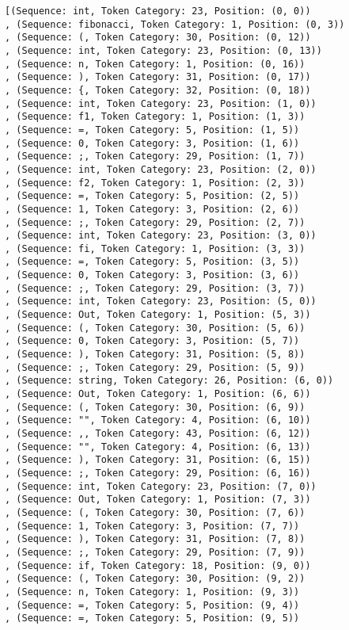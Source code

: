 \documentclass[a4paper, 12pt, article]{memoir}
\begin{document}
\begin{lstlisting}
[(Sequence: int, Token Category: 23, Position: (0, 0))
, (Sequence: fibonacci, Token Category: 1, Position: (0, 3))
, (Sequence: (, Token Category: 30, Position: (0, 12))
, (Sequence: int, Token Category: 23, Position: (0, 13))
, (Sequence: n, Token Category: 1, Position: (0, 16))
, (Sequence: ), Token Category: 31, Position: (0, 17))
, (Sequence: {, Token Category: 32, Position: (0, 18))
, (Sequence: int, Token Category: 23, Position: (1, 0))
, (Sequence: f1, Token Category: 1, Position: (1, 3))
, (Sequence: =, Token Category: 5, Position: (1, 5))
, (Sequence: 0, Token Category: 3, Position: (1, 6))
, (Sequence: ;, Token Category: 29, Position: (1, 7))
, (Sequence: int, Token Category: 23, Position: (2, 0))
, (Sequence: f2, Token Category: 1, Position: (2, 3))
, (Sequence: =, Token Category: 5, Position: (2, 5))
, (Sequence: 1, Token Category: 3, Position: (2, 6))
, (Sequence: ;, Token Category: 29, Position: (2, 7))
, (Sequence: int, Token Category: 23, Position: (3, 0))
, (Sequence: fi, Token Category: 1, Position: (3, 3))
, (Sequence: =, Token Category: 5, Position: (3, 5))
, (Sequence: 0, Token Category: 3, Position: (3, 6))
, (Sequence: ;, Token Category: 29, Position: (3, 7))
, (Sequence: int, Token Category: 23, Position: (5, 0))
, (Sequence: Out, Token Category: 1, Position: (5, 3))
, (Sequence: (, Token Category: 30, Position: (5, 6))
, (Sequence: 0, Token Category: 3, Position: (5, 7))
, (Sequence: ), Token Category: 31, Position: (5, 8))
, (Sequence: ;, Token Category: 29, Position: (5, 9))
, (Sequence: string, Token Category: 26, Position: (6, 0))
, (Sequence: Out, Token Category: 1, Position: (6, 6))
, (Sequence: (, Token Category: 30, Position: (6, 9))
, (Sequence: "", Token Category: 4, Position: (6, 10))
, (Sequence: ,, Token Category: 43, Position: (6, 12))
, (Sequence: "", Token Category: 4, Position: (6, 13))
, (Sequence: ), Token Category: 31, Position: (6, 15))
, (Sequence: ;, Token Category: 29, Position: (6, 16))
, (Sequence: int, Token Category: 23, Position: (7, 0))
, (Sequence: Out, Token Category: 1, Position: (7, 3))
, (Sequence: (, Token Category: 30, Position: (7, 6))
, (Sequence: 1, Token Category: 3, Position: (7, 7))
, (Sequence: ), Token Category: 31, Position: (7, 8))
, (Sequence: ;, Token Category: 29, Position: (7, 9))
, (Sequence: if, Token Category: 18, Position: (9, 0))
, (Sequence: (, Token Category: 30, Position: (9, 2))
, (Sequence: n, Token Category: 1, Position: (9, 3))
, (Sequence: =, Token Category: 5, Position: (9, 4))
, (Sequence: =, Token Category: 5, Position: (9, 5))

\end{lstlisting}
\end{document}
